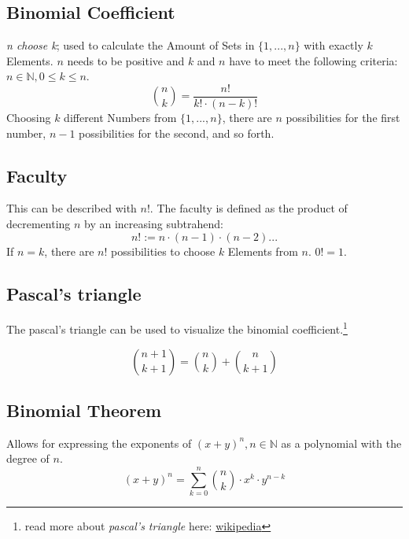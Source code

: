 \documentclass[twoside, a4paper, twocolumn]{article}
\begin{document}
    \subsection{Binomial Coefficient}
    \textit{n choose k}; used to calculate the Amount of Sets in
    $\{1,\textrm{...},n\}$ with exactly $k$ Elements. $n$ needs to be positive
    and $k$ and $n$ have to meet the following criteria: $n \in \mathbb{N}, 0
    \leq k \leq n$.
    \begin{equation}
        \binom{n}{k} = \frac{n!}{k! \cdot (n-k)!}
    \end{equation}
    Choosing $k$ different Numbers from $\{1,\textrm{...},n\}$, there are $n$
    possibilities for the first number, $n-1$ possibilities for the second, and
    so forth. 

    \subsection{Faculty}
    This can be described with $n!$. The faculty is defined as the
    product of decrementing $n$ by an increasing subtrahend:
    \begin{equation}
        n! := n \cdot (n-1) \cdot (n-2) \textrm{...}
    \end{equation}
    If $n = k$, there are $n!$ possibilities to choose $k$ Elements from $n$.
    $0! = 1$.

    \subsection{Pascal's triangle}
    The pascal's triangle can be used to visualize the binomial
    coefficient.\footnote{read more about \textit{pascal's triangle}
    here: \href{https://en.wikipedia.org/wiki/Pascal's_triangle}{wikipedia}}

    \begin{equation}
        \binom{n+1}{k+1} = \binom{n}{k} + \binom{n}{k+1}
    \end{equation}

    \subsection{Binomial Theorem}
    Allows for expressing the exponents of $(x+y)^n, n \in \mathbb{N}$ as a
    polynomial with the degree of $n$.
    \begin{equation}
        (x+y)^n = \sum^n_{k=0} \binom{n}{k} \cdot x^k \cdot y^{n-k}
    \end{equation}
\end{document}

